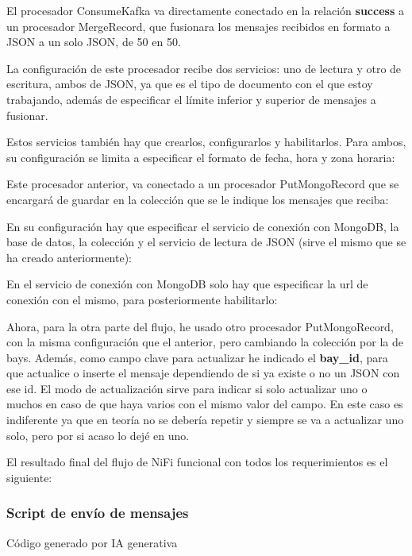\documentclass{../../../miPlantilla}
\begin{document}
El procesador ConsumeKafka va directamente conectado en la relación \textbf{success} a un procesador MergeRecord, que fusionara los mensajes recibidos
en formato a JSON a un solo JSON, de 50 en 50.

La configuración de este procesador recibe dos servicios: uno de lectura y otro de escritura, ambos de JSON, ya que es el tipo de documento con el que
estoy trabajando, además de especificar el límite inferior y superior de mensajes a fusionar.

Estos servicios también hay que crearlos, configurarlos y habilitarlos. Para ambos, su configuración se limita a especificar el formato de fecha, hora y
zona horaria:

Este procesador anterior, va conectado a un procesador PutMongoRecord que se encargará de guardar en la colección que se le indique los mensajes que reciba:

En su configuración hay que especificar el servicio de conexión con MongoDB, la base de datos, la colección y el servicio de lectura de JSON (sirve el mismo
que se ha creado anteriormente):

En el servicio de conexión con MongoDB solo hay que especificar la url de conexión con el mismo, para posteriormente habilitarlo:

Ahora, para la otra parte del flujo, he usado otro procesador PutMongoRecord, con la misma configuración que el anterior, pero cambiando la colección por
la de bays. Además, como campo clave para actualizar he indicado el \textbf{bay\_id}, para que actualice o inserte el mensaje dependiendo de si ya existe
o no un JSON con ese id. El modo de actualización sirve para indicar si solo actualizar uno o muchos en caso de que haya varios con el mismo valor del campo.
En este caso es indiferente ya que en teoría no se debería repetir y siempre se va a actualizar uno solo, pero por si acaso lo dejé en uno.

El resultado final del flujo de NiFi funcional con todos los requerimientos es el siguiente:

\subsubsection*{Script de envío de mensajes}
\label{anexo:script-sendMessages}
{\tiny*Código generado por IA generativa}
\end{document}
